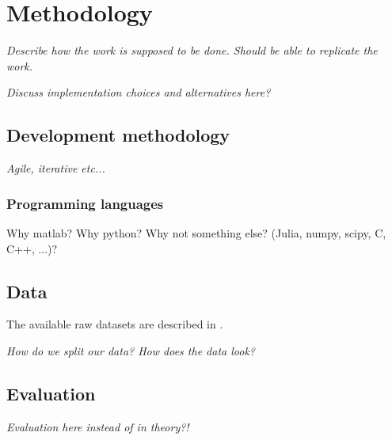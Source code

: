 \chapter{Methodology}\label{cha:method}

\textit{Describe how the work is supposed to be done. Should be able to replicate the work.}

\textit{Discuss implementation choices and alternatives here?}


\section{Development methodology}

\textit{Agile, iterative etc...}

\subsection{Programming languages}

Why matlab? Why python? Why not something else? (Julia, numpy, scipy, C, C++, ...)?


\section{Data}

The available raw datasets are described in .

\textit{How do we split our data? How does the data look?}


\section{Evaluation}

\textit{Evaluation here instead of in theory?!}


